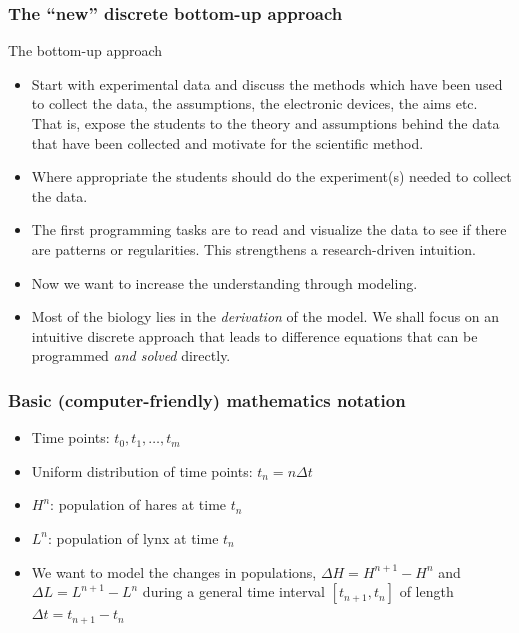 \documentclass{beamer}
\begin{document}
\begin{frame}
\frametitle{The ``new'' discrete bottom-up approach}

\begin{block}{The bottom-up approach }
\begin{itemize}
\pause
 \item Start with experimental data and discuss the methods which have been used to collect the data, the assumptions, the electronic devices, the aims etc. That is, expose the students to the theory and assumptions behind the data that have been collected and motivate for the scientific method.

\pause
 \item Where appropriate the students should do the experiment(s) needed to collect the data.

\pause
 \item The first programming tasks are to read and visualize the data to see if there are patterns or regularities. This strengthens a research-driven intuition.

\pause
 \item Now we want to increase the understanding through modeling.

\pause
 \item Most of the biology lies in the \emph{derivation} of the model. We shall
   focus on an intuitive discrete approach that leads to difference
   equations that can be programmed \emph{and solved} directly.
\end{itemize}

\noindent
\end{block}
\end{frame}

\begin{frame}
\frametitle{Basic (computer-friendly) mathematics notation}

\begin{block}{}
\begin{itemize}
 \item Time points: $t_0,t_1,\ldots,t_m$

 \item Uniform distribution of time points: $t_n=n\Delta t$

 \item $H^n$: population of hares at time $t_n$

 \item $L^n$: population of lynx at time $t_n$

 \item We want to model the changes in populations, $\Delta H=H^{n+1}-H^n$
   and $\Delta L=L^{n+1}-L^n$ during a general time interval $[t_{n+1},t_n]$
   of length $\Delta t=t_{n+1}-t_n$
\end{itemize}

\noindent
\end{block}
\end{frame}
\end{document}
